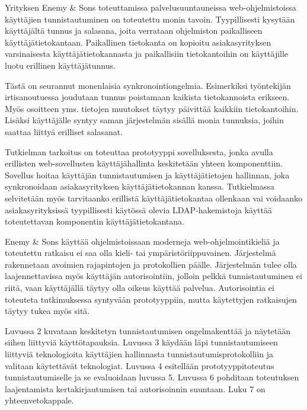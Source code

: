 Yrityksen Enemy \& Sons toteuttamissa palvelusuuntauneissa web-ohjelmistoissa käyttäjien tunnistautuminen on toteutettu monin tavoin. Tyypillisesti kysytään käyttäjältä tunnus ja salasana, joita verrataan ohjelmiston paikalliseen käyttäjätietokantaan. Paikallinen tietokanta on kopioitu asiakasyrityksen varsinaisesta käyttäjätietokannasta ja paikallisiin tietokantoihin on käyttäjille luotu erillinen käyttäjätunnus.

Tästä on seurannut monenlaisia synkronointiongelmia. Esimerkiksi työntekijän irtisanoutuessa joudutaan tunnus poistamaan kaikista tietokannoista erikseen. Myös osoitteen yms. tietojen muutokset täytyy päivittää kaikkiin tietokantoihin. Lisäksi käyttäjälle syntyy saman järjestelmän sisällä monia tunnuksia, joihin saattaa liittyä erilliset salasanat.

Tutkielman tarkoitus on toteuttaa prototyyppi sovelluksesta, jonka avulla erillisten web-sovellusten käyttäjähallinta keskitetään yhteen komponenttiin. Sovellus hoitaa käyttäjän tunnistautumisen ja käyttäjätietojen hallinnan, joka synkronoidaan asiakasyrityksen käyttäjätietokannan kanssa. Tutkielmassa selvitetään myös tarvitaanko erillistä käyttäjätietokantaa ollenkaan vai voidaanko asiakasyrityksissä tyypillisesti käytössä olevia LDAP-hakemistoja käyttää toteutettavan komponentin käyttäjätietokantana.

Enemy \& Sons käyttää ohjelmistoissaan moderneja web-ohjelmointikieliä ja toteutettu ratkaisu ei saa olla kieli- tai ympäristöriippuvainen. Järjestelmä rakennetaan avoimien rajapintojen ja protokollien päälle. Järjestelmän tulee olla laajennettavissa myös käyttäjän autorisointiin, jolloin pelkkä tunnistautuminen ei riitä, vaan käyttäjällä täytyy olla oikeus käyttää palvelua. Autorisointia ei toteuteta tutkimuksessa syntyvään prototyyppiin, mutta käytettyjen ratkaisujen täytyy tukea myös sitä.

Luvussa 2 kuvataan keskitetyn tunnistautumisen ongelmakenttää ja näytetään siihen liittyviä käyttötapauksia. Luvussa 3 käydään läpi tunnistautumiseen liittyviä teknologioita käyttäjien hallinnasta tunnistautumisprotokolliin ja valitaan käytettävät teknologiat. Luvussa 4 esitellään prototyyppitoteutus tunnistautumiselle ja se evaluoidaan luvussa 5. Luvussa 6 pohditaan toteutuksen laajentamista kertakirjautumisen tai autorisoinnin suuntaan. Luku 7 on yhteenvetokappale.
